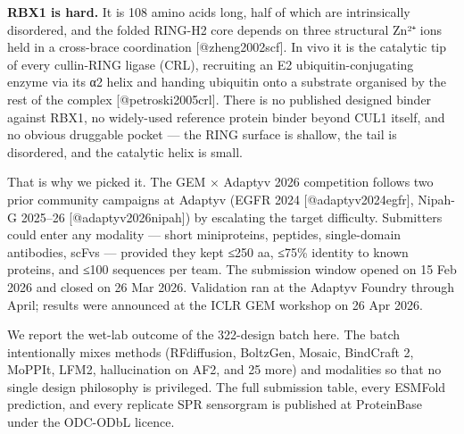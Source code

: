 \textbf{RBX1 is hard.} It is 108 amino acids long, half of which are
intrinsically disordered, and the folded RING-H2 core depends on three
structural Zn²⁺ ions held in a cross-brace coordination
{[}@zheng2002scf{]}. In vivo it is the catalytic tip of every
cullin-RING ligase (CRL), recruiting an E2 ubiquitin-conjugating enzyme
via its α2 helix and handing ubiquitin onto a substrate organised by the
rest of the complex {[}@petroski2005crl{]}. There is no published
designed binder against RBX1, no widely-used reference protein binder
beyond CUL1 itself, and no obvious druggable pocket --- the RING surface
is shallow, the tail is disordered, and the catalytic helix is small.

That is why we picked it. The GEM × Adaptyv 2026 competition follows two
prior community campaigns at Adaptyv (EGFR 2024 {[}@adaptyv2024egfr{]},
Nipah-G 2025--26 {[}@adaptyv2026nipah{]}) by escalating the target
difficulty. Submitters could enter any modality --- short miniproteins,
peptides, single-domain antibodies, scFvs --- provided they kept ≤250
aa, ≤75\% identity to known proteins, and ≤100 sequences per team. The
submission window opened on 15 Feb 2026 and closed on 26 Mar 2026.
Validation ran at the Adaptyv Foundry through April; results were
announced at the ICLR GEM workshop on 26 Apr 2026.

We report the wet-lab outcome of the 322-design batch here. The batch
intentionally mixes methods (RFdiffusion, BoltzGen, Mosaic, BindCraft 2,
MoPPIt, LFM2, hallucination on AF2, and 25 more) and modalities so that
no single design philosophy is privileged. The full submission table,
every ESMFold prediction, and every replicate SPR sensorgram is
published at ProteinBase under the ODC-ODbL licence.
